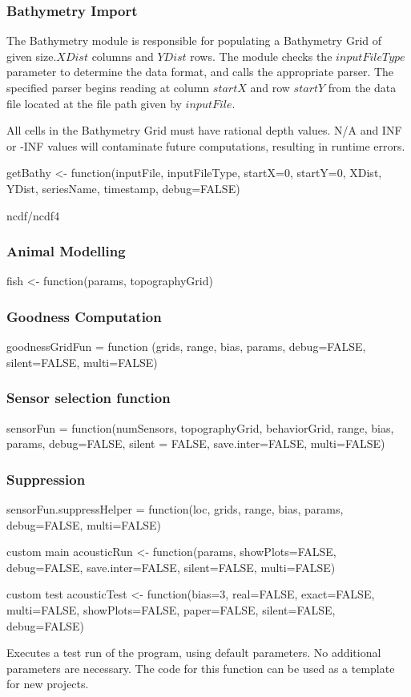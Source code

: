\subsubsection{Bathymetry Import}
The Bathymetry module is responsible for populating a Bathymetry Grid of given size.$XDist$ columns and $YDist$ rows.  The module checks the $inputFileType$ parameter to determine the data format, and calls the appropriate parser.  The specified parser begins reading at column $startX$ and row $startY$ from the data file located at the file path given by $inputFile$.

All cells in the Bathymetry Grid must have rational depth values.  N/A and INF or -INF values will contaminate future computations, resulting in runtime errors.

getBathy <- function(inputFile, inputFileType, startX=0, startY=0, XDist, YDist, seriesName, timestamp, debug=FALSE) {
	ncdf/ncdf4
	
\subsubsection{Animal Modelling}
fish <- function(params, topographyGrid) {

\subsubsection{Goodness Computation}
goodnessGridFun = function (grids, range, bias, params, debug=FALSE, silent=FALSE, multi=FALSE) 

\subsubsection{Sensor selection function}
sensorFun = function(numSensors, topographyGrid, behaviorGrid, range, bias, params, debug=FALSE, silent = FALSE, save.inter=FALSE, multi=FALSE) {

\subsubsection{Suppression}
sensorFun.suppressHelper = function(loc, grids, range, bias, params, debug=FALSE, multi=FALSE) {

custom main
acousticRun <- function(params, showPlots=FALSE, debug=FALSE, save.inter=FALSE, silent=FALSE, multi=FALSE) {

custom test
acousticTest <- function(bias=3, real=FALSE, exact=FALSE, multi=FALSE, showPlots=FALSE, paper=FALSE, silent=FALSE, debug=FALSE) {
	Executes a test run of the program, using default parameters.  No additional 
	parameters are necessary. The code for this function can be used as a template for new projects.


}}}}}}

